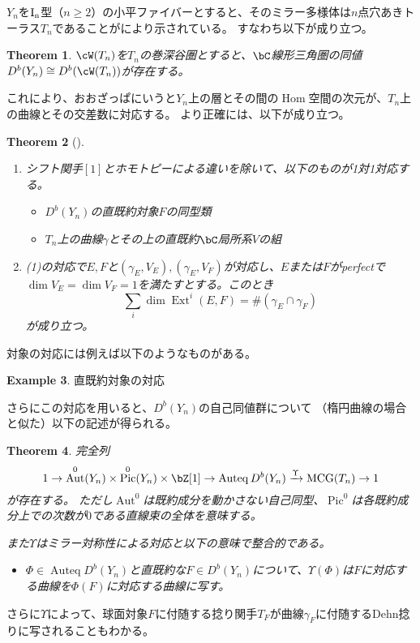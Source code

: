 \documentclass[uplatex,a4paper,dvipdfmx]{jsarticle}
\theoremstyle{plain}
\newtheorem{theorem}{Theorem}[section]
\theoremstyle{definition}
\newtheorem{example}[theorem]{Example}
\DeclareMathOperator{\Hom}{\mathrm{Hom}}
\DeclareMathOperator{\Auteq}{\mathrm{Auteq}}
\DeclareMathOperator{\Pic}{\mathrm{Pic}}
\DeclareMathOperator{\MCG}{\mathrm{MCG}}
\DeclareMathOperator{\Aut}{\mathrm{Aut}}
\DeclareMathOperator{\Ext}{\mathrm{Ext}}
\begin{document}
$Y_n$を$\rm{I}_n$型（$n \geq 2$）の小平ファイバーとすると、そのミラー多様体は$n$点穴あきトーラス$T_n$であることが\cite{MR3663596}により示されている。
すなわち以下が成り立つ。
\begin{theorem}\cite{MR3663596}
	$\cW(T_n)$を$T_n$の巻深谷圏とすると、$\bC$線形三角圏の同値$D^b(Y_n) \cong D^b(\cW(T_n))$が存在する。
\end{theorem}
これにより、おおざっぱにいうと$Y_n$上の層とその間の$\Hom$空間の次元が、$T_n$上の曲線とその交差数に対応する。
より正確には、以下が成り立つ。
\begin{theorem}[\cite{2020arXiv201108288O}]
	\begin{enumerate}
		\item シフト関手$[1]$とホモトピーによる違いを除いて、以下のものが1対1対応する。\begin{itemize}
			      \item $D^b(Y_n)$の直既約対象$F$の同型類
			      \item $T_n$上の曲線$\gamma$とその上の直既約$\bC$局所系$V$の組
		      \end{itemize}
		\item (1)の対応で$E,F$と$(\gamma_E, V_E), (\gamma_E, V_F)$が対応し、$E$または$F$がperfectで$\dim V_E = \dim V_F = 1$を満たすとする。このとき\begin{equation}
			      \sum_{i}\dim\Ext^i(E, F) = \#(\gamma_E \cap \gamma_F)
		      \end{equation}が成り立つ。
	\end{enumerate}
\end{theorem}
対象の対応には例えば以下のようなものがある。
\begin{example}
	直既約対象の対応
\end{example}
さらにこの対応を用いると、$D^b(Y_n)$の自己同値群について
（楕円曲線の場合と似た）以下の記述が得られる。
\begin{theorem}\cite[Theorem D]{2020arXiv201108288O}
	完全列
	\begin{equation}
		1 \to \Aut^0(Y_n) \times \Pic^0(Y_n)\times \bZ[1] \to \Auteq{D^b(Y_n)} \xrightarrow{\Upsilon} \MCG(T_n) \to 1
	\end{equation}
	が存在する。
	ただし$\Aut^0$は既約成分を動かさない自己同型、$\Pic^0$は各既約成分上での次数が$0$である直線束の全体を意味する。

	また$\Upsilon$はミラー対称性による対応と以下の意味で整合的である。
	\begin{itemize}
		\item $\Phi \in \Auteq{D^b(Y_n)}$と直既約な$F \in D^b(Y_n)$について、$\Upsilon(\Phi)$は$F$に対応する曲線を$\Phi(F)$に対応する曲線に写す。
	\end{itemize}
\end{theorem}
さらに$\Upsilon$によって、球面対象$F$に付随する捻り関手$T_F$が曲線$\gamma_F$に付随するDehn捻りに写されることもわかる。
\end{document}
